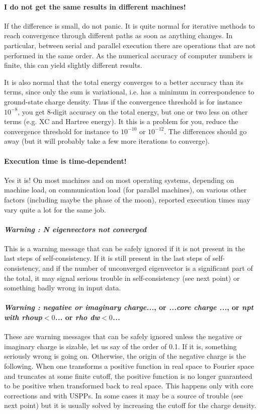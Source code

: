 \documentclass[12pt,a4paper]{article}
\begin{document}
\paragraph{I do not get the same results in different machines!}
If the difference is small, do not panic. It is quite normal for
iterative methods to reach convergence through different paths as soon
as anything changes. In particular, between serial and parallel
execution there are operations that are not performed in the same
order. As the numerical accuracy of computer numbers is finite, this
can yield slightly different results. 

It is also normal that the total energy converges to a better accuracy
than its terms, since only the sum is variational, i.e. has a minimum
in correspondence to ground-state charge density. Thus if the
convergence threshold is for instance $10^{-8}$, you get 8-digit
accuracy on the total energy, but one or two less on other terms
(e.g. XC and Hartree energy). It this is a problem for you, reduce the
convergence threshold for instance to  $10^{-10}$ or  $10^{-12}$. The
differences should go away (but it will probably take a few more
iterations to converge). 

\paragraph{Execution time is time-dependent!}
Yes it is! On most machines and on
most operating systems, depending on machine load, on communication load
(for parallel machines), on various other factors (including maybe the phase
of the moon), reported execution times may vary quite a lot for the same job.

\paragraph{{\em Warning : N eigenvectors not converged}}
This is a warning message that can be safely ignored if it is not
present in the last steps of self-consistency. If it is still present
in the last steps of self-consistency, and if the number of
unconverged eigenvector is a significant part of the total, it may
signal serious trouble in self-consistency (see next point) or
something badly wrong in input data.

\paragraph{{\em Warning : negative or imaginary charge...}, or 
{\em ...core  charge ...}, or {\em npt with rhoup$<0$...} or {\em rho dw$<0$...}} 
These are warning messages that can be safely ignored unless the
negative or imaginary charge is sizable, let us say of the order of
0.1. If it is, something seriously wrong is going on. Otherwise, the
origin of the negative charge is the following. When one transforms a
positive function in real space to Fourier space and truncates at some
finite cutoff, the positive function is no longer guaranteed to be
positive when transformed back to real space. This happens only with
core corrections and with USPPs. In some cases it
may be a source of trouble (see next point) but it is usually solved
by increasing the cutoff for the charge density.
\end{document}
